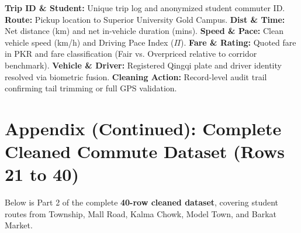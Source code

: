 \documentclass[10pt, a4paper]{article}
\begin{document}
\begin{explainbox}
\scriptsize
\textbf{Trip ID \& Student:} Unique trip log and anonymized student commuter ID. \textbf{Route:} Pickup location to Superior University Gold Campus. \textbf{Dist \& Time:} Net distance (km) and net in-vehicle duration (mins). \textbf{Speed \& Pace:} Clean vehicle speed (km/h) and Driving Pace Index (\(\Pi\)). \textbf{Fare \& Rating:} Quoted fare in PKR and fare classification (Fair vs. Overpriced relative to corridor benchmark). \textbf{Vehicle \& Driver:} Registered Qingqi plate and driver identity resolved via biometric fusion. \textbf{Cleaning Action:} Record-level audit trail confirming tail trimming or full GPS validation.
\end{explainbox}

\newpage


\section{Appendix (Continued): Complete Cleaned Commute Dataset (Rows 21 to 40)}

Below is Part 2 of the complete \textbf{40-row cleaned dataset}, covering student routes from Township, Mall Road, Kalma Chowk, Model Town, and Barkat Market.

\vspace{2pt}
\end{document}
